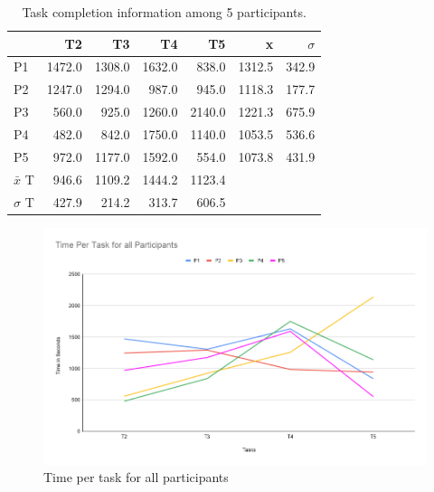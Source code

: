 \begin{table}[H]
\caption{Task completion information among 5 participants. }
\label{table:meanstdofTime}
\centering
\begin{tabular}{lrrrrrr}
\hline \hline
             & T2 & T3 & T4 & T5 & x & $\sigma$  \\ \hline 
P1           & 1472.0                    & 1308.0                    & 1632.0                    & 838.0                     & 1312.5                                   & 342.9                                \\ \hline
P2           & 1247.0                    & 1294.0                    & 987.0                     & 945.0                     & 1118.3                                   & 177.7                                \\ \hline
P3           & 560.0                     & 925.0                     & 1260.0                    & 2140.0                    & 1221.3                                   & 675.9                                \\ \hline
P4           & 482.0                     & 842.0                     & 1750.0                    & 1140.0                   & 1053.5                                   & 536.6                                \\ \hline
P5           & 972.0                     & 1177.0                    & 1592.0                    & 554.0                     & 1073.8                                   & 431.9                                \\ \hline \hline
$\bar{x}$ T & 946.6                   & 1109.2                  & 1444.2                  & 1123.4                  &                     &                       \\ \hline
$\sigma$ T  & 427.9                   & 214.2                   & 313.7                   & 606.5                   &                    &                      \\ \hline \hline 
\end{tabular}
\end{table}

\begin{figure}[H]
    \centering
    \includegraphics[width=15cm]{figures/Results/allParticipants.png}
    \caption{Time per task for all participants}
    \label{fig:alltime}
\end{figure}

